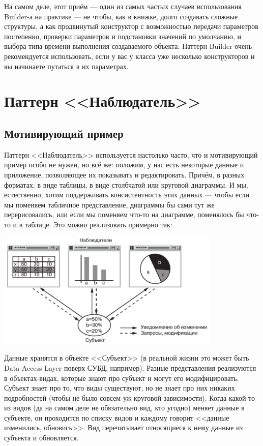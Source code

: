 \documentclass{../text-style}
\begin{document}
На самом деле, этот приём --- один из самых частых случаев использования Builder-а на практике --- не чтобы, как в книжке, долго создавать сложные структуры, а как продвинутый конструктор с возможностью передачи параметров постепенно, проверки параметров и подстановки значений по умолчанию, и выбора типа времени выполнения создаваемого объекта. Паттерн Builder очень рекомендуется использовать, если у вас у класса уже несколько конструкторов и вы начинаете путаться в их параметрах.

\section{Паттерн <<Наблюдатель>>}

\subsection{Мотивирующий пример}

Паттерн <<Наблюдатель>> используется настолько часто, что и мотивирующий пример особо не нужен, но всё же: положим, у нас есть некоторые данные и приложение, позволяющее их показывать и редактировать. Причём, в разных форматах: в виде таблицы, в виде столбчатой или круговой диаграммы. И мы, естественно, хотим поддерживать консистентность этих данных --- чтобы если мы поменяем табличное представление, диаграммы бы сами тут же перерисовались, или если мы поменяем что-то на диаграмме, поменялось бы что-то и в таблице. Это можно реализовать примерно так:

\begin{center}
    \includegraphics[width=0.8\textwidth]{observerExample.png}
\end{center}

Данные хранятся в объекте <<Субъект>> (в реальной жизни это может быть Data Access Layer поверх СУБД, например). Разные представления реализуются в объектах-видах, которые знают про субъект и могут его модифицировать. Субъект знает про то, что виды существуют, но не знает про них никаких подробностей (чтобы не было совсем уж круговой зависимости). Когда какой-то из видов (да на самом деле не обязательно вид, кто угодно) меняет данные в субъекте, он проходится по списку видов и каждому говорит <<данные изменились, обновись>>. Вид перечитывает относящиеся к нему данные из субъекта и обновляется.
\end{document}
